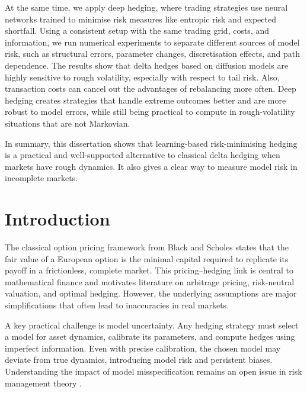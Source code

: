 \documentclass[12pt,a4paper]{article}
\theoremstyle{definition}
\theoremstyle{plain}
\theoremstyle{remark}
\theoremstyle{plain}
\begin{document}
At the same time, we apply deep hedging, where trading strategies use neural networks trained to minimise risk measures like entropic risk and expected shortfall.
Using a consistent setup with the same trading grid, costs, and information, we run numerical experiments to separate different sources of model risk, such as structural errors, parameter changes, discretisation effects, and path dependence.
The results show that delta hedges based on diffusion models are highly sensitive to rough volatility, especially with respect to tail risk. Also, transaction costs can cancel out the advantages of rebalancing more often. Deep hedging creates strategies that handle extreme outcomes better and are more robust to model errors, while still being practical to compute in rough-volatility situations that are not Markovian.

In summary, this dissertation shows that learning-based risk-minimising hedging is a practical and well-supported alternative to classical delta hedging when markets have rough dynamics. It also gives a clear way to measure model risk in incomplete markets.

\newpage

\vfill

\tableofcontents

\newpage
\section{Introduction}

The classical option pricing framework from Black and Scholes \cite{BlackScholes1973} states that the fair value of a European option is the minimal capital required to replicate its payoff in a frictionless, complete market. This pricing–hedging link is central to mathematical finance and motivates literature on arbitrage pricing, risk-neutral valuation, and optimal hedging. However, the underlying assumptions are major simplifications that often lead to inaccuracies in real markets.

A key practical challenge is model uncertainty. Any hedging strategy must select a model for asset dynamics, calibrate its parameters, and compute hedges using imperfect information. Even with precise calibration, the chosen model may deviate from true dynamics, introducing model risk and persistent biases. Understanding the impact of model misspecification remains an open issue in risk management theory \cite{ElKaroui1998Robustness}.
\end{document}
